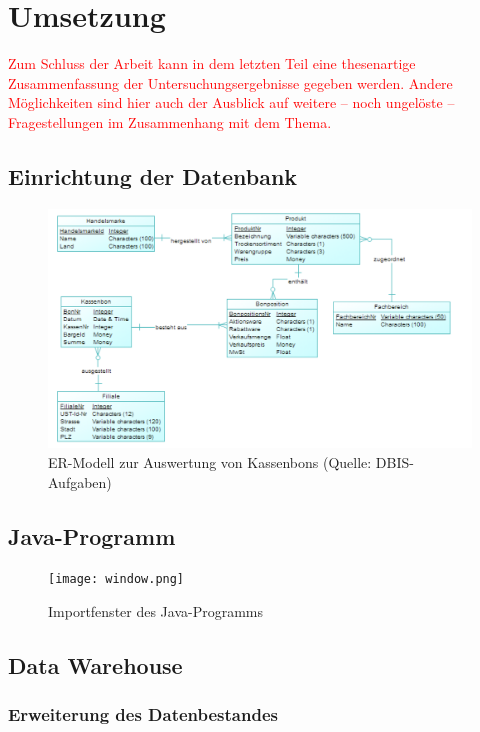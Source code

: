 \section{Umsetzung}
\textcolor{red}{Zum Schluss der Arbeit kann in dem letzten Teil eine thesenartige Zusammenfassung der Untersuchungsergebnisse gegeben werden. Andere Möglichkeiten sind hier auch der Ausblick auf weitere – noch ungelöste – Fragestellungen im Zusammenhang mit dem Thema.}

\subsection{Einrichtung der Datenbank}

\begin{figure}[ht!]
  \centering
  \includegraphics[width=1.2\linewidth]{pictures/db_basic.png}
  \caption[ER-Modell zur Auswertung von Kassenbons]{ER-Modell zur Auswertung von Kassenbons (Quelle: DBIS-Aufgaben)}
\end{figure}

\subsection{Java-Programm}


\begin{figure}[ht!]
  \texttt{[image: window.png]}
  \caption{Importfenster des Java-Programms}
\end{figure}


\textcolor{red}{\blindtext}

\subsection{Data Warehouse}

\subsubsection{Erweiterung des Datenbestandes}

